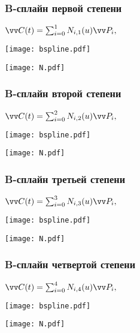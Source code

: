 \documentclass[10pt]{beamer}
\begin{document}
   \begin{frame}\frametitle{B-сплайн первой степени}
 	
 	{
 	}{
 		
 		$\vv C(t) = \sum_{i=0}^{1}N_{i,1}(u)\vv P_i,$
 		
 		\texttt{[image: bspline.pdf]}
 		
 		\texttt{[image: N.pdf]}
 		
 	}
 	
 \end{frame}
 
  \begin{frame}\frametitle{B-сплайн второй степени}
 	
 	{
 	}{
 		
 		$\vv C(t) = \sum_{i=0}^{2}N_{i,2}(u)\vv P_i,$
 		
 		\texttt{[image: bspline.pdf]}
 		
 		\texttt{[image: N.pdf]}
 		
 	}
 	
 \end{frame}
 
   \begin{frame}\frametitle{B-сплайн третьей степени}
 	
 	{
 	}{
 		
 		$\vv C(t) = \sum_{i=0}^{3}N_{i,3}(u)\vv P_i,$
 		
 		\texttt{[image: bspline.pdf]}
 		
 		\texttt{[image: N.pdf]}
 		
 	}
 	
 \end{frame}
 
   \begin{frame}\frametitle{B-сплайн четвертой степени}
 	
 	{
 	}{
 		
 		$\vv C(t) = \sum_{i=0}^{4}N_{i,4}(u)\vv P_i,$
 		
 		\texttt{[image: bspline.pdf]}
 		
 		\texttt{[image: N.pdf]}
 		
 	}
 	
 \end{frame}
 
\end{document}
